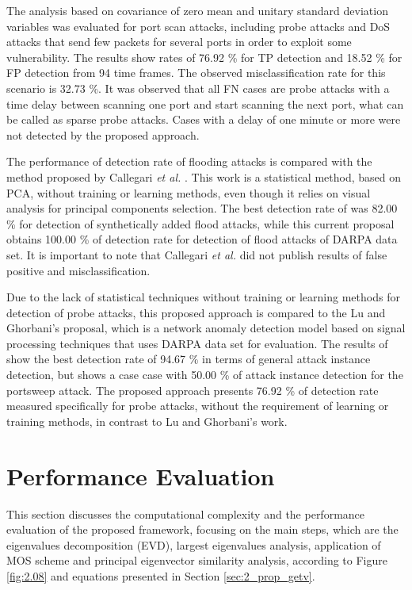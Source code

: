 The analysis based on covariance of zero mean and unitary standard deviation variables was evaluated for port scan attacks, including probe attacks and DoS attacks that send few packets for several ports in order to exploit some vulnerability. The results show rates of 76.92 \% for TP detection and 18.52 \% for FP detection from 94 time frames. The observed misclassification rate for this scenario is 32.73 \%. It was observed that all FN cases are probe attacks with a time delay between scanning one port and start scanning the next port, what can be called as sparse probe attacks. Cases with a delay of one minute or more were not detected by the proposed approach.

The performance of detection rate of flooding attacks is compared with the method proposed by Callegari \emph{et al.} \cite{callegari2011novel}. This work is a statistical method, based on PCA, without training or learning methods, even though it relies on visual analysis for principal components selection. The best detection rate of \cite{callegari2011novel} was 82.00 \% for detection of synthetically added flood attacks, while this current proposal obtains 100.00 \% of detection rate for detection of flood attacks of DARPA data set. It is important to note that Callegari \emph{et al.} \cite{callegari2011novel} did not publish results of false positive and misclassification.

Due to the lack of statistical techniques without training or learning methods for detection of probe attacks, this proposed approach is compared to the Lu and Ghorbani's \cite{Lu2009} proposal, which is a network anomaly detection model based on signal processing techniques that uses DARPA data set for evaluation. The results of \cite{Lu2009} show the best detection rate of 94.67 \% in terms of general attack instance detection, but shows a case case with 50.00 \% of attack instance detection for the portsweep attack. The proposed approach presents 76.92 \% of detection rate measured specifically for probe attacks, without the requirement of learning or training methods, in contrast to Lu and Ghorbani's \cite{Lu2009} work.


\section{Performance Evaluation}
\label{sec:2_Complexity}

This section discusses the computational complexity and the performance evaluation of the proposed framework, focusing on the main steps, which are the eigenvalues decomposition (EVD), largest eigenvalues analysis, application of MOS scheme and principal eigenvector similarity analysis, according to Figure \ref{fig:2.08} and equations presented in Section \ref{sec:2_prop_getv}.

